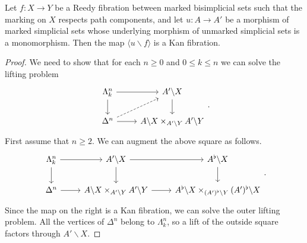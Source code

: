 \documentclass[main.tex]{subfiles}
\begin{document}
\begin{proposition}
  \label{prop:cartesian_marking_respects_path_components}
  Let $f\colon X \to Y$ be a Reedy fibration between marked bisimplicial sets such that the marking on $X$ respects path components, and let $u\colon A \to A'$ be a morphism of marked simplicial sets whose underlying morphism of unmarked simplicial sets is a monomorphism. Then the map $\langle u \backslash f \rangle$ is a Kan fibration.
\end{proposition}
\begin{proof}
  We need to show that for each $n \geq 0$ and $0 \leq k \leq n$ we can solve the lifting problem
  \begin{equation*}
    \begin{tikzcd}
      \Lambda^{n}_{k}
      \arrow[r]
      \arrow[d]
      & A' \backslash X
      \arrow[d]
      \\
      \Delta^{n}
      \arrow[r]
      \arrow[ur, dashed]
      & A \backslash X \times_{A' \backslash Y} A' \backslash Y
    \end{tikzcd}.
  \end{equation*}
  First assume that $n \geq 2$. We can augment the above square as follows.
  \begin{equation*}
    \begin{tikzcd}
      \Lambda^{n}_{k}
      \arrow[r]
      \arrow[d]
      & A' \backslash X
      \arrow[r]
      \arrow[d]
      & A^{\flat} \backslash X
      \arrow[d]
      \\
      \Delta^{n}
      \arrow[r]
      & A \backslash X \times_{A' \backslash Y} A' \backslash Y
      \arrow[r]
      & A^{\flat} \backslash X \times_{(A')^{\flat} \backslash Y} (A')^{\flat} \backslash X
    \end{tikzcd}.
  \end{equation*}
  Since the map on the right is a Kan fibration, we can solve the outer lifting problem. All the vertices of $\Delta^{n}$ belong to $\Lambda^{n}_{k}$, so a lift of the outside square factors through $A' \backslash X$.


\end{proof}
\end{document}
